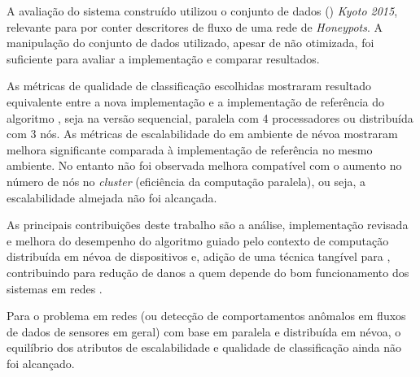 A avaliação do sistema construído utilizou o conjunto de dados (\dataset)
\emph{Kyoto 2015}, relevante para \nids por conter descritores de fluxo de uma
rede de \emph{Honeypots}.
A manipulação do conjunto de dados utilizado, apesar de não otimizada, foi
suficiente para avaliar a implementação e comparar resultados.


As métricas de qualidade de classificação escolhidas mostraram resultado
equivalente entre a nova implementação e a implementação de referência do
algoritmo \minas, seja na versão sequencial, paralela com 4 processadores ou
distribuída com 3 nós.
As métricas de escalabilidade do \mfog em ambiente de névoa \iot mostraram
melhora significante comparada à implementação de referência no mesmo ambiente.
No entanto não foi observada melhora compatível com o aumento no número de nós
no \emph{cluster}
(eficiência da computação paralela), ou seja, a escalabilidade
almejada não foi alcançada.

As principais contribuições deste trabalho são a análise, implementação revisada
e melhora do desempenho do algoritmo \minas guiado pelo contexto de computação
distribuída em névoa de dispositivos \iot e, adição de uma técnica tangível para
\nids, contribuindo para redução de danos a quem depende do bom funcionamento
dos sistemas em redes \iot.





Para o problema \nids em redes \iot (ou detecção de comportamentos anômalos em
fluxos de dados de sensores \iot em geral) com base em \nd paralela e
distribuída em névoa, o equilíbrio dos atributos de escalabilidade e
qualidade de classificação ainda não foi alcançado.

